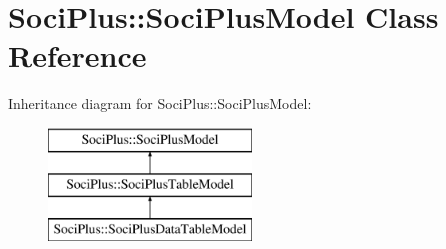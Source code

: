 \hypertarget{class_soci_plus_1_1_soci_plus_model}{\section{Soci\+Plus\+:\+:Soci\+Plus\+Model Class Reference}
\label{class_soci_plus_1_1_soci_plus_model}
}
Inheritance diagram for Soci\+Plus\+:\+:Soci\+Plus\+Model\+:\begin{figure}[H]
\begin{center}
\leavevmode
\includegraphics[height=3.000000cm]{class_soci_plus_1_1_soci_plus_model}
\end{center}
\end{figure}
